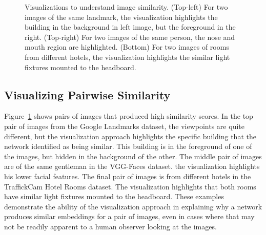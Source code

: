 \begin{figure}[t]
\begin{subfigure}[b]{.48\columnwidth}
\begin{tabular}{cc}
        \end{tabular}
    \end{subfigure}
    \caption{Visualizations to understand image similarity. (Top-left) For two images of the same landmark, the visualization highlights the building in the background in left image, but the foreground in the right. (Top-right) For two images of the same person, the nose and mouth region are highlighted. (Bottom) For two images of rooms from different hotels, the visualization highlights the similar light fixtures mounted to the headboard.}
    \label{fig:clarification}
\end{figure}


\subsection{Visualizing Pairwise Similarity}
Figure~\ref{fig:clarification} shows pairs of images that produced high similarity scores. In the top pair of images from the Google Landmarks dataset, the viewpoints are quite different, but the visualization approach highlights the specific building that the network identified as being similar. This building is in the foreground of one of the images, but hidden in the background of the other. The middle pair of images are of the same gentleman in the VGG-Faces dataset. the visualization highlights his lower facial features. The final pair of images is from different hotels in the TraffickCam Hotel Rooms dataset. The visualization highlights that both rooms have similar light fixtures mounted to the headboard. These examples demonstrate the ability of the visualization approach in explaining why a network produces similar embeddings for a pair of images, even in cases where that may not be readily apparent to a human observer looking at the images.

